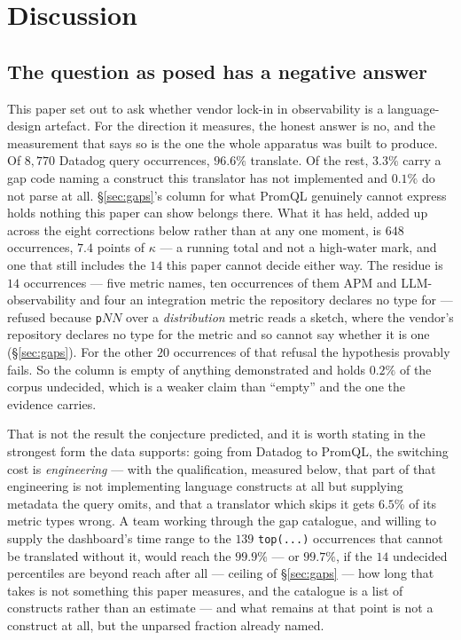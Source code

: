 
\section{Discussion}
\label{sec:discussion}

\subsection{The question as posed has a negative answer}

This paper set out to ask whether vendor lock-in in observability is a language-design
artefact. For the direction it measures, the honest answer is no, and the
measurement that says so is the one the whole apparatus was built to produce. Of
$8{,}770$ Datadog query occurrences, $96.6\%$ translate. Of the rest, $3.3\%$ carry a
gap code naming a construct this translator has not implemented and $0.1\%$ do not parse
at all. \S\ref{sec:gaps}'s column for what PromQL genuinely cannot express holds nothing
this paper can show belongs there. What it has held, added up across the eight
corrections below rather than at any one moment, is $648$ occurrences, $7.4$ points of
$\kappa$ --- a running total and not a high-water mark, and one that still includes the
$14$ this paper cannot decide either way. The
residue is $14$ occurrences --- five metric names, ten occurrences of them APM and
LLM-observability and four an integration metric the repository declares no type
for --- refused
because \texttt{p}$NN$ over a \emph{distribution} metric reads a sketch, where the
vendor's repository declares no type for the metric and so cannot say whether it is one
(\S\ref{sec:gaps}). For the other $20$ occurrences of that refusal the hypothesis
provably fails. So the column is empty of anything demonstrated and holds $0.2\%$ of the
corpus undecided, which is a weaker claim than ``empty'' and the one the evidence
carries.

That is not the result the conjecture predicted, and it is worth stating in the strongest
form the data supports: going from Datadog to PromQL, the switching cost is
\emph{engineering} --- with the qualification, measured below, that part of that
engineering is not implementing language constructs at all but supplying metadata the
query omits, and that a translator which skips it gets $6.5\%$ of its metric types
wrong. A team working through the gap catalogue, and willing to supply the dashboard's
time range to the $139$ \texttt{top(...)} occurrences that cannot be translated without
it, would reach the $99.9\%$ --- or $99.7\%$, if the $14$ undecided percentiles are
beyond reach after all ---
ceiling of \S\ref{sec:gaps} --- how long that takes is not something this paper
measures, and the catalogue is a list of constructs rather than an estimate --- and what
remains at that point is not a construct at all, but the unparsed fraction already
named.

